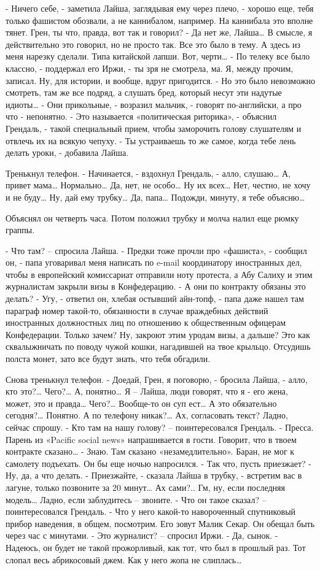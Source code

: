 - Ничего себе, - заметила Лайша, заглядывая ему через плечо, - хорошо еще, тебя только фашистом обозвали, а не каннибалом, например. На каннибала это вполне тянет. Грен, ты что, правда, вот так и говорил?
- Да нет же, Лайша… В смысле, я действительно это говорил, но не просто так. Все это было в тему. А здесь из меня нарезку сделали. Типа китайской лапши. Вот, черти…
- По телеку все было классно, - поддержал его Иржи, - ты зря не смотрела, ма. Я, между прочим, записал. Ну, для истории, и вообще, вдруг пригодится.
- Но это было невозможно смотреть, там же все подряд, а слушать бред, который несут эти надутые идиоты…
- Они прикольные, - возразил мальчик, - говорят по-английски, а про что - непонятно.
- Это называется «политическая риторика», - объяснил Грендаль, - такой специальный прием, чтобы заморочить голову слушателям и отвлечь их на всякую чепуху.
- Ты устраиваешь то же самое, когда тебе лень делать уроки, - добавила Лайша.

Тренькнул телефон.
- Начинается, - вздохнул Грендаль, - алло, слушаю… А, привет мама… Нормально… Да, нет, не особо… Ну их всех… Нет, честно, не хочу и не буду… Ну, дай ему трубку… Да, папа… Подожди, минуту, я тебе объясню…

Объяснял он четверть часа. Потом положил трубку и молча налил еще рюмку граппы.

- Что там? – спросила Лайша.
- Предки тоже прочли про «фашиста», - сообщил он, - папа уговаривал меня написать по e-mail координатору иностранных дел, чтобы в европейский комиссариат отправили ноту протеста, а Абу Салиху и этим журналистам закрыли визы в Конфедерацию.
- А они по контракту обязаны это делать?
- Угу, - ответил он, хлебая остывший айн-топф, - папа даже нашел там параграф номер такой-то, обязанности в случае враждебных действий иностранных должностных лиц по отношению к общественным офицерам Конфедерации. Только зачем? Ну, закроют этим уродам визы, а дальше? Это как сквалыжничать по поводу чужой кошки, нагадившей на твое крыльцо. Отсудишь полста монет, зато все будут знать, что тебя обгадили.

Снова тренькнул телефон.
- Доедай, Грен, я поговорю, - бросила Лайша, - алло, кто это?… Чего?… А, понятно… Я – Лайша, люди говорят, что я - его жена, может, это и правда… Чего?… Вообще-то он суп ест… А это обязательно сегодня?… Понятно. А по телефону никак?… Ах, согласовать текст? Ладно, сейчас спрошу.
- Кто там на нашу голову? – поинтересовался Грендаль.
- Пресса. Парень из «Pacific social news» напрашивается в гости. Говорит, что в твоем контракте сказано…
- Знаю. Там сказано «незамедлительно». Баран, не мог к самолету подъехать. Он бы еще ночью напросился.
- Так что, пусть приезжает?
- Ну, да, а что делать.
- Приезжайте, - сказала Лайша в трубку, - встретим вас в лагуне, только позвоните за 20 минут… Ах сами?.. Гм, ну, если последняя модель… Ладно, если заблудитесь – звоните.
- Что он такое сказал? – поинтересовался Грендаль.
- Что у него какой-то навороченный спутниковый прибор наведения, в общем, посмотрим. Его зовут Малик Секар. Он обещал быть через час с минутами.
- Это журналист? – спросил Иржи.
- Да, сынок.
- Надеюсь, он будет не такой прожорливый, как тот, что был в прошлый раз. Тот слопал весь абрикосовый джем. Как у него жопа не слиплась…



